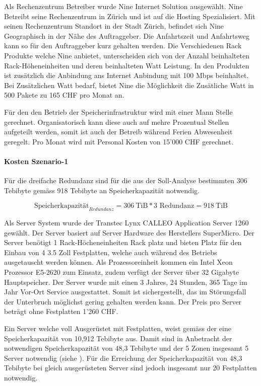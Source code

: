 Als Rechenzentrum Betreiber wurde Nine Internet Solution ausgewählt. Nine Betreibt seine Rechenzentrum in Zürich und ist auf die Hosting Spezialisiert. Mit seinen Rechenzentrum Standort in der Stadt Zürich, befindet sich Nine Geographisch in der Nähe des Auftraggeber. Die Anfahrtszeit und Anfahrtsweg kann so für den Auftraggeber kurz gehalten werden. Die Verschiedenen Rack Produkte welche Nine anbietet, unterscheiden sich von der Anzahl beinhalteten Rack-Höheneinheiten und deren beinhalteten Watt Leistung. In den Produkten ist zusätzlich die Anbindung ans  Internet Anbindung mit 100 Mbps beinhaltet. Bei Zusätzlichen Watt bedarf, bietet Nine die Möglichkeit die Zusätliche Watt in 500 Pakete zu 165 CHF pro Monat an.

Für den den Betrieb der Speicherinfrastruktur wird mit einer Mann Stelle gerechnet. Organisatorisch kann diese auch auf mehre Prozentual Stellen aufgeteilt werden, somit ist auch der Betreib während Ferien Abwesenheit geregelt. Pro Monat wird mit Personal Kosten von 15'000 CHF gerechnet.


\paragraph*{Kosten Szenario-1}

Für die dreifache Redundanz sind für die aus der Soll-Analyse bestimmten 306 Tebibyte gemäss  918 Tebibyte an Speicherkapazität notwendig.

\begin{equation}
\mbox{Speicherkapazität}_{Redundanz} = 306  \mathrm{\ TiB} * 3 \mbox{\ Redundanz} =  918 \mathrm{\ TiB}
\label{eqn:SpeicherkapazitätS1}
\end{equation}


Als Server System wurde der Transtec Lynx CALLEO Application Server 1260 gewählt. Der Server basiert auf Server Hardware des Herstellers  SuperMicro. Der Server benötigt 1 Rack-Höcheneinheiten Rack platz und bieten Platz für den Einbau von 4 3.5 Zoll Festplatten, welche auch während des Betriebs ausgetauscht werden können. Als Prozessoreinheit kommen ein Intel Xeon Prozessor E5-2620 zum Einsatz, zudem verfügt der Server über 32 Gigabyte Hauptspeicher. Der Server wurde mit einen 3 Jahres, 24 Stunden, 365 Tage im Jahr Vor-Ort Service ausgestattet. Somit ist sichergestellt, das im Störungsfall der Unterbruch möglichst gering gehalten werden kann. Der Preis pro Server beträgt ohne Festplatten 1'260 CHF.


Ein Server welche voll Ausgerüstet mit Festplatten, weist gemäss der   eine Speicherkapazität von 10,912 Tebibyte aus. Damit sind in Anbetracht der notwendigen Speicherkapazität von 48,3 Tebibyte und der 5 Zonen insgesamt 5 Server notwendig (siehe ). Für die Erreichung der Speicherkapazität von 48,3 Tebibyte bei gleich ausgerüsteten Server sind jedoch insgesamt nur 20 Festplatten notwendig.

